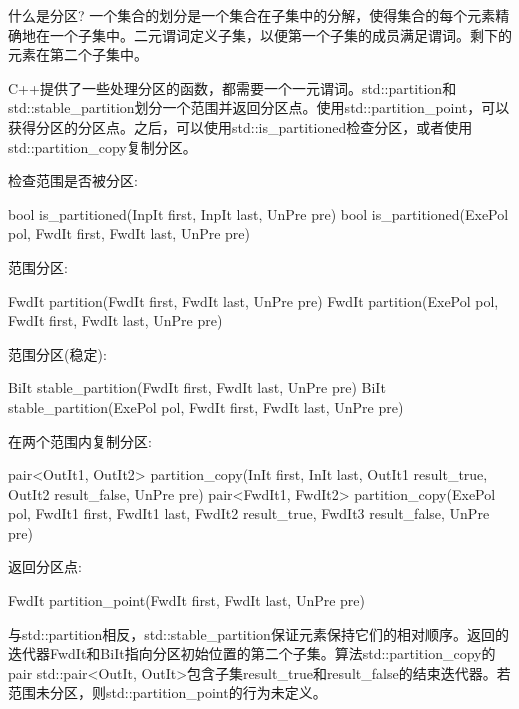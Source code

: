 

\begin{myTip}{什么是分区?}
一个集合的划分是一个集合在子集中的分解，使得集合的每个元素精确地在一个子集中。二元谓词定义子集，以便第一个子集的成员满足谓词。剩下的元素在第二个子集中。
\end{myTip}

C++提供了一些处理分区的函数，都需要一个一元谓词。std::partition和std::stable\_partition划分一个范围并返回分区点。使用std::partition\_point，可以获得分区的分区点。之后，可以使用std::is\_partitioned检查分区，或者使用std::partition\_copy复制分区。

检查范围是否被分区:

\begin{cpp}
bool is_partitioned(InpIt first, InpIt last, UnPre pre)
bool is_partitioned(ExePol pol, FwdIt first, FwdIt last, UnPre pre)
\end{cpp}

范围分区:

\begin{cpp}
FwdIt partition(FwdIt first, FwdIt last, UnPre pre)
FwdIt partition(ExePol pol, FwdIt first, FwdIt last, UnPre pre)
\end{cpp}

范围分区(稳定):

\begin{cpp}
BiIt stable_partition(FwdIt first, FwdIt last, UnPre pre)
BiIt stable_partition(ExePol pol, FwdIt first, FwdIt last, UnPre pre)
\end{cpp}

在两个范围内复制分区:

\begin{cpp}
pair<OutIt1, OutIt2> partition_copy(InIt first, InIt last,
					 OutIt1 result_true, OutIt2 result_false, UnPre pre)
pair<FwdIt1, FwdIt2> partition_copy(ExePol pol, FwdIt1 first, FwdIt1 last,
					 FwdIt2 result_true, FwdIt3 result_false, UnPre pre)
\end{cpp}

返回分区点:

\begin{cpp}
FwdIt partition_point(FwdIt first, FwdIt last, UnPre pre)
\end{cpp}

与std::partition相反，std::stable\_partition保证元素保持它们的相对顺序。返回的迭代器FwdIt和BiIt指向分区初始位置的第二个子集。算法std::partition\_copy的pair std::pair<OutIt, OutIt>包含子集result\_true和result\_false的结束迭代器。若范围未分区，则std::partition\_point的行为未定义。

